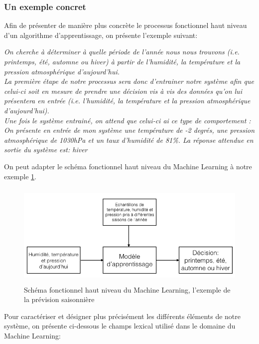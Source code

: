 \subsubsection{Un exemple concret}
\label{Le Machine Learning: Généralités sur le Machine Learning: Définition et principe général:un exemple concret}
Afin de présenter de manière plus concrète le processus fonctionnel haut niveau d'un algorithme d'apprentissage, on présente l'exemple suivant:

\textit{On cherche à déterminer à quelle période de l'année nous nous trouvons (i.e. printemps, été, automne ou hiver) à partir de l'humidité, la température et la pression atmosphérique d'aujourd'hui. \\
	La première étape de notre processus sera donc d'entrainer notre système afin que celui-ci soit en mesure de prendre une décision vis à vis des données qu'on lui présentera en entrée (i.e. l'humidité, la température et la pression atmosphérique d'aujourd'hui). \\
	Une fois le système entrainé, on attend que celui-ci ai ce type de comportement : \\
	On présente en entrée de mon système une température de -2 degrés, une pression atmosphérique de 1030hPa et un taux d'humidité de 81\%. La réponse attendue en sortie du système est: hiver}

On peut adapter le schéma fonctionnel haut niveau du Machine Learning à notre exemple \ref{fig:Schéma fonctionnel haut niveau du Machine Learning, l'exemple prévision saisonnière}. 

\begin{figure}[h]
	\centering\includegraphics[height=5cm]{images/ML_high_level_expl.jpeg}
	\caption{Schéma fonctionnel haut niveau du Machine Learning, l'exemple de la prévision saisonnière}
	\label{fig:Schéma fonctionnel haut niveau du Machine Learning, l'exemple prévision saisonnière}
\end{figure}

Pour caractériser et  désigner plus précisément les différents éléments de notre système, on présente ci-dessous le champs lexical utilisé dans le domaine du Machine Learning:

